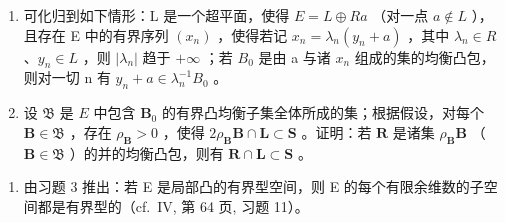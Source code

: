 \begin{enumerate}
\def\labelenumi{\alph{enumi})}
\item
  可化归到如下情形：L 是一个超平面，使得 \(E = L \oplus Ra\) （对一点 \(a \notin L\) ），且存在 E 中的有界序列 \((x_{n})\) ，使得若记 \(x_{n} = \lambda_{n}(y_{n} + a)\) ，其中 \(\lambda_{n} \in R\) 、\(y_{n} \in L\) ，则 \(|\lambda_{n}|\) 趋于 \(+\infty\) ；若 \(B_{0}\) 是由 a 与诸 \(x_{n}\) 组成的集的均衡凸包，则对一切 n 有 \(y_{n} + a \in \lambda_{n}^{-1}B_{0}\) 。
\item
  设 \(\mathfrak{B}\) 是 \(E\) 中包含 \(\mathbf{B}_0\) 的有界凸均衡子集全体所成的集；根据假设，对每个 \(\mathbf{B} \in \mathfrak{B}\) ，存在 \(\rho_{\mathbf{B}} > 0\) ，使得 \(2\rho_{\mathbf{B}}\mathbf{B} \cap \mathbf{L} \subset \mathbf{S}\) 。证明：若 \(\mathbf{R}\) 是诸集 \(\rho_{\mathbf{B}}\mathbf{B}\) （\(\mathbf{B} \in \mathfrak{B}\) ）的并的均衡凸包，则有 \(\mathbf{R} \cap \mathbf{L} \subset \mathbf{S}\) 。
\end{enumerate}

\begin{enumerate}
\def\labelenumi{\arabic{enumi})}
\setcounter{enumi}{3}
\tightlist
\item
  由习题 3 推出：若 E 是局部凸的有界型空间，则 E 的每个有限余维数的子空间都是有界型的（cf.~IV, 第 64 页, 习题 11）。
\end{enumerate}


